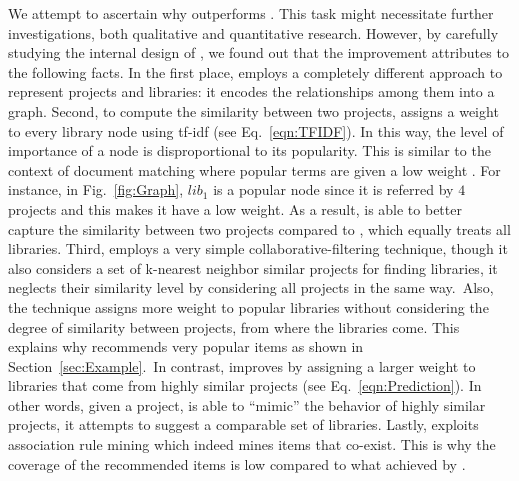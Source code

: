 \vspace{.1cm}
\noindent \rqthird
\vspace{-.05cm}

We attempt to ascertain why \CR outperforms \LR. This task might necessitate further investigations, both 
qualitative and quantitative research. However, by carefully studying the internal design of \LR, we found out that 
the improvement attributes to the following facts. In the first place, \CR employs a completely different approach 
to represent projects and libraries: it encodes the relationships among them into a graph. Second, to compute the 
similarity between two projects, \CR assigns a weight to every library node using tf-idf (see 
Eq.~\eqref{eqn:TFIDF}). In this way, the level of importance of a node is disproportional to its popularity. This is 
similar to the context of document matching where popular terms are given a low weight 
\cite{DBLP:journals/ijswis/HliaoutakisVVPM06}. For instance, in Fig.~\ref{fig:Graph}, $lib_1$ is a popular node since 
it is referred by $4$ projects and this makes it have a low weight. As a result, \CR is able to better capture the 
similarity between two projects compared to \LR, which equally treats all libraries. Third, \LR employs a very 
simple collaborative-filtering technique, though it also considers a set of k-nearest neighbor similar projects for 
finding libraries, it neglects their similarity level by considering all projects in the same way.~Also, the technique 
assigns more weight to popular libraries without considering the degree of similarity between projects, from where the 
libraries come. This explains why \LR recommends very popular items as shown in Section~\ref{sec:Example}.~In 
contrast, \CR improves by assigning a larger weight to libraries that come from highly similar projects (see 
Eq.~\eqref{eqn:Prediction}). In other words, given a project, \CR is able to ``mimic'' the behavior of highly 
similar projects, it attempts to suggest a comparable set of libraries. Lastly, \LR exploits association rule mining 
which indeed mines items that co-exist. This is why the coverage of the recommended items is low compared to what 
achieved by \CR.


